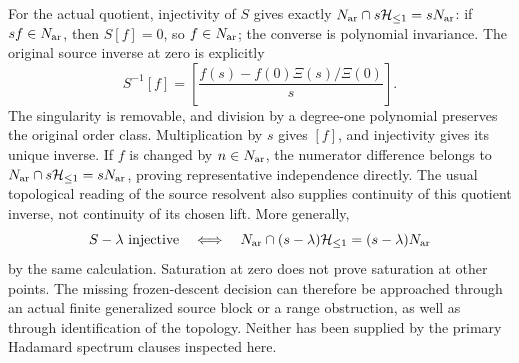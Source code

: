 For the actual quotient, injectivity of $S$ gives exactly
$N_{\rm ar}\cap s\mathcal H_{\leq 1}=sN_{\rm ar}$: if $sf\in N_{\rm ar}$, then
$S[f]=0$, so $f\in N_{\rm ar}$; the converse is polynomial invariance.
The original source inverse at zero is explicitly
\begin{equation}
 S^{-1}[f]=\left[
 \frac{f(s)-f(0)\Xi(s)/\Xi(0)}{s}\right].
 \label{eq:cq-source-explicit-zero-resolvent}
\end{equation}
The singularity is removable, and division by a degree-one
polynomial preserves the original order class. Multiplication
by $s$ gives $[f]$, and injectivity gives its unique inverse.
If $f$ is changed by $n\in N_{\rm ar}$, the numerator difference
belongs to $N_{\rm ar}\cap s\mathcal H_{\leq 1}=sN_{\rm ar}$, proving representative
independence directly. The usual topological reading of
the source resolvent also supplies continuity of this
quotient inverse, not continuity of its chosen lift.
More generally,
\[
 S-\lambda\text{ injective}\quad\Longleftrightarrow\quad
 N_{\rm ar}\cap(s-\lambda)\mathcal H_{\leq 1}=(s-\lambda)N_{\rm ar}
\]
by the same calculation. Saturation at zero does not prove
saturation at other points.
The missing frozen-descent decision can therefore be
approached through an actual finite generalized source block
or a range obstruction, as well as through identification
of the topology. Neither has been supplied by the primary
Hadamard spectrum clauses inspected here.

